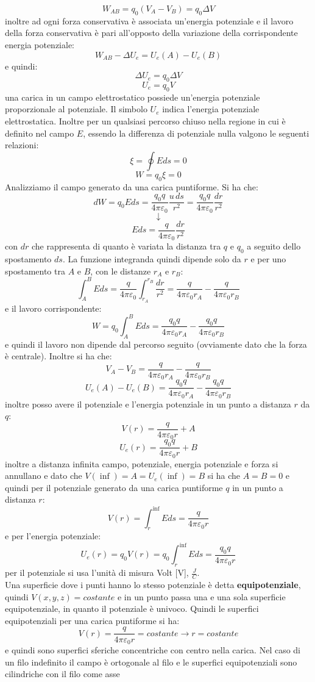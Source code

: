 \documentclass[a4paper,12pt, oneside]{book}
\begin{document}
$$W_{AB}=q_0(V_A-V_B)=q_0\Delta V$$
inoltre ad ogni forza conservativa è associata un'energia potenziale e il lavoro della forza conservativa è pari all'opposto della variazione della corrispondente energia potenziale:
$$W_{AB}-\Delta U_e=U_e(A)-U_e(B)$$
e quindi:
$$\Delta U_e=q_0\Delta V$$
$$U_e=q_0V$$
una carica in un campo elettrostatico possiede un'energia potenziale proporzionale al potenziale. Il simbolo $U_e$ indica l'energia potenziale elettrostatica. Inoltre per un qualsiasi percorso chiuso nella regione in cui è definito nel campo $E$, essendo la differenza di potenziale nulla valgono le seguenti relazioni:
$$\xi=\oint Eds=0$$
$$W=q_0\xi=0$$
Analizziamo il campo generato da una carica puntiforme. Si ha che:
$$dW=q_0Eds=\frac{q_0q}{4\pi\varepsilon_0}\frac{u\,ds}{r^2}=\frac{q_0q}{4\pi\varepsilon_0}\frac{dr}{r^2}$$
$$\downarrow$$
$$Eds=\frac{q}{4\pi\varepsilon_0}\frac{dr}{r^2}$$
con $dr$ che rappresenta di quanto è variata la distanza tra $q$ e $q_0$ a seguito dello spostamento $ds$. La funzione integranda quindi dipende solo da $r$ e per uno spostamento tra $A$ e $B$, con le distanze $r_A$ e $r_B$:
$$\int_A^B Eds=\frac{q}{4\pi\varepsilon_0}\int_{r_A}^{r_B}\frac{dr}{r^2}=\frac{q}{4\pi\varepsilon_0r_A}-\frac{q}{4\pi\varepsilon_0r_B}$$
e il lavoro corrispondente:
$$W=q_0\int_A^B Eds=\frac{q_0q}{4\pi\varepsilon_0r_A}-\frac{q_0q}{4\pi\varepsilon_0r_B}$$
e quindi il lavoro non dipende dal percorso seguito (ovviamente dato che la forza è centrale). Inoltre si ha che:
$$V_A-V_B=\frac{q}{4\pi\varepsilon_0r_A}-\frac{q}{4\pi\varepsilon_0r_B}$$
$$U_e(A)-U_e(B)=\frac{q_0q}{4\pi\varepsilon_0r_A}-\frac{q_0q}{4\pi\varepsilon_0r_B}$$
inoltre posso avere il potenziale e l'energia potenziale in un punto a distanza $r$ da $q$:
$$V(r)=\frac{q}{4\pi\varepsilon_0r}+A$$
$$U_e(r)=\frac{q_0q}{4\pi\varepsilon_0r}+B$$
inoltre a distanza infinita campo, potenziale, energia potenziale e forza si annullano e dato che $V(\inf)=A=U_e(\inf)=B$ si ha che $A=B=0$ e quindi per il potenziale generato da una carica puntiforme $q$ in un punto a distanza $r$:
$$V(r)=\int_r^{\inf} Eds=\frac{q}{4\pi\varepsilon_0r}$$
e per l'energia potenziale:
$$U_e(r)=q_0V(r)=q_0\int_r^{\inf} Eds=\frac{q_0q}{4\pi\varepsilon_0r}$$
per il potenziale si usa l'unità di misura Volt [V], $\frac{J}{C}$.\\
Una superficie dove i punti hanno lo stesso potenziale è detta \textbf{equipotenziale}, quindi $V(x,y,z)=costante$ e in un punto passa una e una sola superficie equipotenziale, in quanto il potenziale è univoco. Quindi le superfici equipotenziali per una carica puntiforme si ha:
$$V(r)=\frac{q}{4\pi\varepsilon_0r}=costante\longrightarrow r=costante$$
e quindi sono superfici sferiche concentriche con centro nella carica. Nel caso di un filo indefinito il campo è ortogonale al filo e le superfici equipotenziali sono cilindriche con il filo come asse
\end{document}
